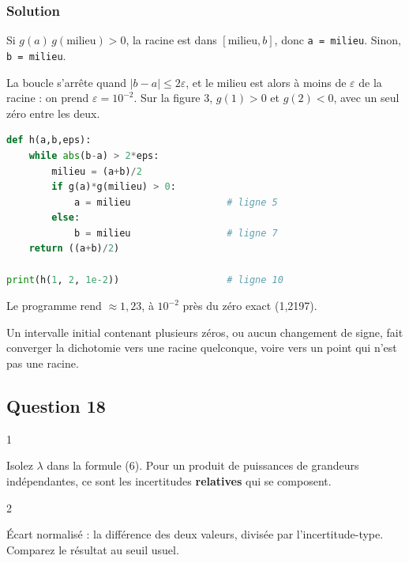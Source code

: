 \documentclass[11pt,a4paper]{article}
\begin{document}
\hypertarget{solution-16}{%
\subsubsection{Solution}\label{solution-16}}

Si \(g(a)\,g(\text{milieu})>0\), la racine est dans \([\text{milieu},b]\), donc \texttt{a\ =\ milieu}. Sinon, \texttt{b\ =\ milieu}.

La boucle s'arrête quand \(|b-a|\le2\varepsilon\), et le milieu est alors à moins de \(\varepsilon\) de la racine : on prend \(\varepsilon=10^{-2}\). Sur la figure 3, \(g(1)>0\) et \(g(2)<0\), avec un seul zéro entre les deux.

\begin{lstlisting}[language=Python]
def h(a,b,eps):
    while abs(b-a) > 2*eps:
        milieu = (a+b)/2
        if g(a)*g(milieu) > 0:
            a = milieu                 # ligne 5
        else:
            b = milieu                 # ligne 7
    return ((a+b)/2)

print(h(1, 2, 1e-2))                   # ligne 10
\end{lstlisting}

Le programme rend \(\approx1{,}23\), à \(10^{-2}\) près du zéro exact (1,2197).

\begin{piege}

Un intervalle initial contenant plusieurs zéros, ou aucun changement de signe, fait converger la dichotomie vers une racine quelconque, voire vers un point qui n'est pas une racine.

\end{piege}

\hypertarget{question-18}{%
\subsection{Question 18}\label{question-18}}

\begin{indication}{1}

Isolez \(\lambda\) dans la formule (6). Pour un produit de puissances de grandeurs indépendantes, ce sont les incertitudes \textbf{relatives} qui se composent.

\end{indication}

\begin{indication}{2}

Écart normalisé : la différence des deux valeurs, divisée par l'incertitude-type. Comparez le résultat au seuil usuel.

\end{indication}
\end{document}

